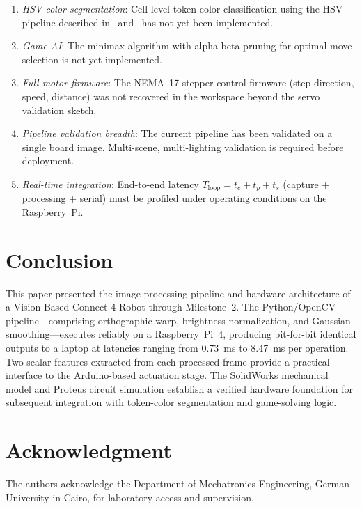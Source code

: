 \documentclass[conference]{IEEEtran}
\begin{document}
\begin{enumerate}
\item \emph{HSV color segmentation}: Cell-level token-color classification
  using the HSV pipeline described in~\cite{Zubek2021} and~\cite{Park2024}
  has not yet been implemented.
\item \emph{Game AI}: The minimax algorithm with alpha-beta pruning for
  optimal move selection is not yet implemented.
\item \emph{Full motor firmware}: The NEMA~17 stepper control firmware
  (step direction, speed, distance) was not recovered in the workspace
  beyond the servo validation sketch.
\item \emph{Pipeline validation breadth}: The current pipeline has been
  validated on a single board image. Multi-scene, multi-lighting validation
  is required before deployment.
\item \emph{Real-time integration}: End-to-end latency
  \(T_\text{loop} = t_c + t_p + t_s\) (capture + processing + serial) must
  be profiled under operating conditions on the Raspberry~Pi.
\end{enumerate}

\section{Conclusion}
\label{sec:conclusion}

This paper presented the image processing pipeline and hardware architecture
of a Vision-Based Connect-4 Robot through Milestone~2. The Python/OpenCV
pipeline—comprising orthographic warp, brightness normalization, and
Gaussian smoothing—executes reliably on a Raspberry~Pi~4, producing
bit-for-bit identical outputs to a laptop at latencies ranging from
0.73~ms to 8.47~ms per operation. Two scalar features extracted from
each processed frame provide a practical interface to the Arduino-based
actuation stage. The SolidWorks mechanical model and Proteus circuit
simulation establish a verified hardware foundation for subsequent
integration with token-color segmentation and game-solving logic.

\section*{Acknowledgment}

The authors acknowledge the Department of Mechatronics Engineering,
German University in Cairo, for laboratory access and supervision.



\end{document}
